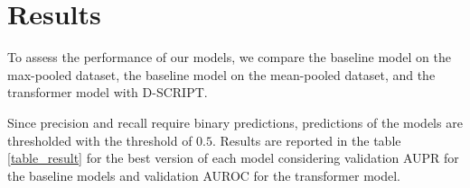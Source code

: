 \documentclass[11pt,a4paper]{article}
\begin{document}
\section{Results}


To assess the performance of our models, we compare the baseline model on the max-pooled dataset, the baseline model on the mean-pooled dataset, and the transformer model with D-SCRIPT.

Since precision and recall require binary predictions, predictions of the models are thresholded with the threshold of $0.5$. Results are reported in the table \ref{table_result} for the best version of each model considering validation AUPR for the baseline models and validation AUROC for the transformer model.





\end{document}
